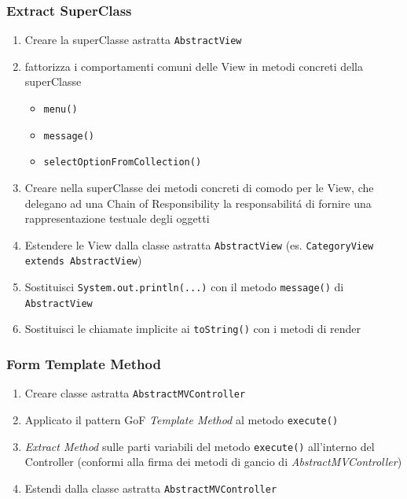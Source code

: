 \begin{frame}
    \frametitle{Extract SuperClass}
    \begin{enumerate}
        \item Creare la superClasse astratta \texttt{AbstractView}
        \item fattorizza i comportamenti comuni delle View in metodi concreti della superClasse
          \begin{itemize}
              \item \texttt{menu()}
              \item \texttt{message()}
              \item \texttt{selectOptionFromCollection()}
          \end{itemize}
        \item Creare nella superClasse dei metodi concreti di comodo per le View, che delegano ad una Chain of Responsibility la responsabilitá
              di fornire una rappresentazione testuale degli oggetti
        \item Estendere le View dalla classe astratta \texttt{AbstractView} (es. \texttt{CategoryView extends AbstractView})
        \item Sostituisci \texttt{System.out.println(...)} con il metodo \texttt{message()} di \texttt{AbstractView}
        \item Sostituisci le chiamate implicite ai \texttt{toString()} con i metodi di render
    \end{enumerate}
\end{frame}

\begin{frame}
    \frametitle{Form Template Method}
    \begin{enumerate}
        \item Creare classe astratta \texttt{AbstractMVController}
        \item Applicato il pattern GoF \emph{Template Method} al metodo \texttt{execute()}
        \item \emph{Extract Method} sulle parti variabili del metodo \texttt{execute()} all'interno del Controller (conformi alla firma dei metodi di gancio di \emph{AbstractMVController})
        \item Estendi dalla classe astratta \texttt{AbstractMVController}
    \end{enumerate}
\end{frame}

